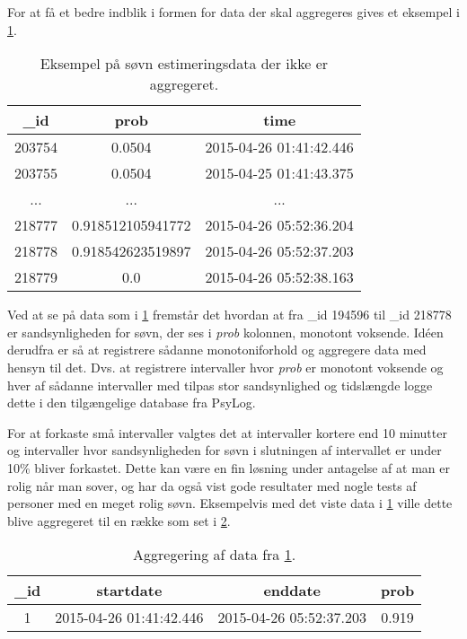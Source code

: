 For at få et bedre indblik i formen for data der skal aggregeres gives et eksempel i \cref{tab:noaggsoevndata}.
\begin{table}[h]
	\centering
\begin{tabular}{|c|c|c|}
	\hline {\_}id & prob & time \\ 
	\hline 203754 & 0.0504 & 2015-04-26 01:41:42.446 \\ 
	\hline 203755 & 0.0504 & 2015-04-25 01:41:43.375 \\ 
	\hline ... & ... & ... \\ 
	\hline 218777 & 0.918512105941772 & 2015-04-26 05:52:36.204 \\ 
	\hline 218778 & 0.918542623519897 & 2015-04-26 05:52:37.203 \\ 
	\hline 218779 & 0.0 & 2015-04-26 05:52:38.163 \\ 
	\hline 
\end{tabular}
\caption{Eksempel på søvn estimeringsdata der ikke er aggregeret.}\label{tab:noaggsoevndata}
\end{table}
Ved at se på data som i \cref{tab:noaggsoevndata} fremstår det hvordan at fra {\_}id 194596 til {\_}id 218778 er sandsynligheden for søvn, der ses i \textit{prob} kolonnen, monotont voksende.
Idéen derudfra er så at registrere sådanne monotoniforhold og aggregere data med hensyn til det.
Dvs. at registrere intervaller hvor \textit{prob} er monotont voksende og hver af sådanne intervaller med tilpas stor sandsynlighed og tidslængde logge dette i den tilgængelige database fra PsyLog.

For at forkaste små intervaller valgtes det at intervaller kortere end 10 minutter og intervaller hvor sandsynligheden for søvn i slutningen af intervallet er under 10\% bliver forkastet.
Dette kan være en fin løsning under antagelse af at man er rolig når man sover, og har da også vist gode resultater med nogle tests af personer med en meget rolig søvn. 
Eksempelvis med det viste data i \cref{tab:noaggsoevndata} ville dette blive aggregeret til en række som set i \cref{tab:aggdat}.

\begin{table}[h]
	\centering
\begin{tabular}{|c|c|c|c|}
	\hline {\_}id & startdate & enddate & prob \\ 
	\hline 1 & 2015-04-26 01:41:42.446 &  2015-04-26 05:52:37.203 & 0.919 \\ 
	\hline 
\end{tabular} 
\caption{Aggregering af data fra \cref{tab:noaggsoevndata}.}\label{tab:aggdat}
\end{table}

